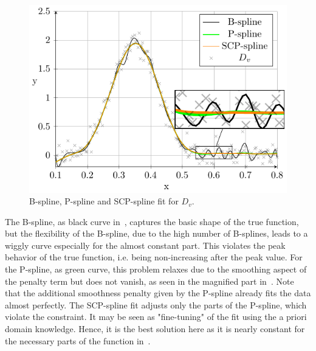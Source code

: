 \begin{figure}[H]
	\centering
	\includegraphics{graphics/pgfplots/cha4/exp-peak.pdf}
	\caption{B-spline, P-spline and SCP-spline fit for $D_v$.}
	\label{fig:test-func-peak-fit}
\end{figure}
%
The B-spline, as black curve in~, captures the basic shape of the true function, but the flexibility of the B-spline, due to the high number of B-splines, leads to a wiggly curve especially for the almost constant part. This violates the peak behavior of the true function, i.e. being non-increasing after the peak value. For the P-spline, as green curve, this problem relaxes due to the smoothing aspect of the penalty term but does not vanish, as seen in the magnified part in~. Note that the additional smoothness penalty given by the P-spline already fits the data almost perfectly. The SCP-spline fit adjusts only the parts of the P-spline, which violate the constraint. It may be seen as "fine-tuning" of the fit using the a priori domain knowledge. Hence, it is the best solution here as it is nearly constant for the necessary parts of the function in~.  

